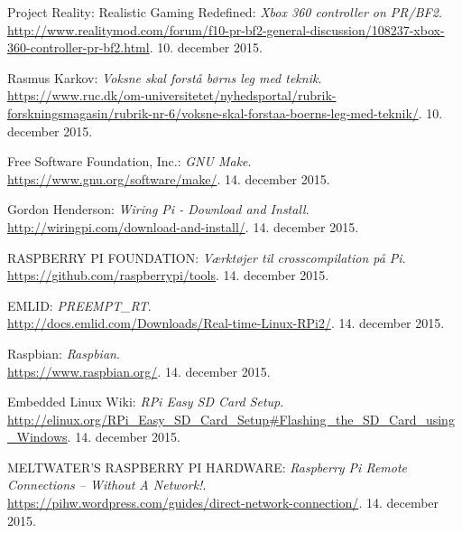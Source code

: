 \begin{thebibliography}{2}
 Project Reality: Realistic Gaming Redefined: \textit{Xbox 360 controller on PR/BF2}. \\
\url{http://www.realitymod.com/forum/f10-pr-bf2-general-discussion/108237-xbox-360-controller-pr-bf2.html}. 10. december 2015.

 Rasmus Karkov: \textit{Voksne skal forstå børns leg med teknik}. \\
\url{https://www.ruc.dk/om-universitetet/nyhedsportal/rubrik-forskningsmagasin/rubrik-nr-6/voksne-skal-forstaa-boerns-leg-med-teknik/}. 10. december 2015.

 Free Software Foundation, Inc.: \textit{GNU Make}. \\
\url{https://www.gnu.org/software/make/}. 14. december 2015.

 Gordon Henderson: \textit{Wiring Pi - Download and Install}. \\
\url{http://wiringpi.com/download-and-install/}. 14. december 2015.

 RASPBERRY PI FOUNDATION: \textit{Værktøjer til crosscompilation på Pi}. \\
\url{https://github.com/raspberrypi/tools}. 14. december 2015.

 EMLID: \textit{PREEMPT\_RT}. \\
\url{http://docs.emlid.com/Downloads/Real-time-Linux-RPi2/}. 14. december 2015.

 Raspbian: \textit{Raspbian}. \\
\url{https://www.raspbian.org/}. 14. december 2015.

 Embedded Linux Wiki: \textit{RPi Easy SD Card Setup}. \\
\url{http://elinux.org/RPi_Easy_SD_Card_Setup#Flashing_the_SD_Card_using_Windows}. 14. december 2015.

 MELTWATER'S RASPBERRY PI HARDWARE: \textit{Raspberry Pi Remote Connections – Without A Network!}. \\
\url{https://pihw.wordpress.com/guides/direct-network-connection/}. 14. december 2015.

\end{thebibliography}
